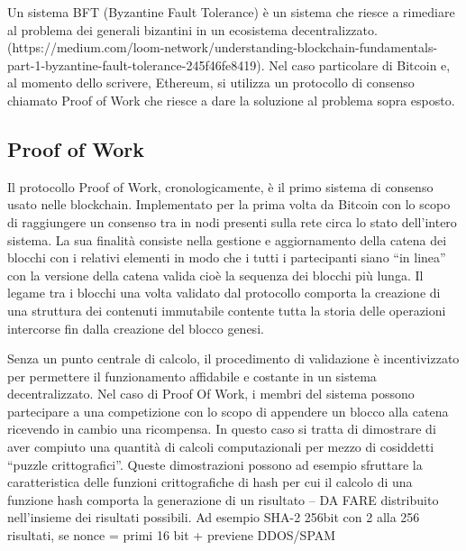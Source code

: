 
Un sistema BFT (Byzantine Fault Tolerance) è un sistema che riesce a rimediare al problema dei generali bizantini in un ecosistema decentralizzato. (https://medium.com/loom-network/understanding-blockchain-fundamentals-part-1-byzantine-fault-tolerance-245f46fe8419). Nel caso particolare di Bitcoin e, al momento dello scrivere, Ethereum, si utilizza un protocollo di consenso chiamato Proof of Work che riesce a dare la soluzione al problema sopra esposto.

\subsection{Proof of Work}

Il protocollo Proof of Work, cronologicamente, è il primo sistema di consenso usato nelle blockchain. Implementato per la prima volta da Bitcoin con lo scopo di raggiungere un consenso tra in nodi presenti sulla rete circa lo stato dell’intero sistema. La sua finalità consiste nella gestione e aggiornamento della catena dei blocchi con i relativi elementi in modo che i tutti i partecipanti siano “in linea” con la versione della catena valida cioè la sequenza dei blocchi più lunga. Il legame tra i blocchi una volta validato dal protocollo comporta la creazione di una struttura dei contenuti immutabile contente tutta la storia delle operazioni intercorse fin dalla creazione del blocco genesi.

Senza un punto centrale di calcolo, il procedimento di validazione è incentivizzato per permettere il funzionamento affidabile e costante in un sistema decentralizzato. Nel caso di Proof Of Work, i membri del sistema possono partecipare a una competizione con lo scopo di appendere un blocco alla catena ricevendo in cambio una ricompensa. In questo caso si tratta di dimostrare di aver compiuto una quantità di calcoli computazionali per mezzo di cosiddetti “puzzle crittografici”. Queste dimostrazioni possono ad esempio sfruttare la caratteristica delle funzioni crittografiche di hash per cui il calcolo di una funzione hash comporta la generazione di un risultato
-- DA FARE
distribuito nell’insieme dei risultati possibili.
Ad esempio SHA-2 256bit con 2 alla 256 risultati, 
se nonce = primi 16 bit
+ previene DDOS/SPAM

